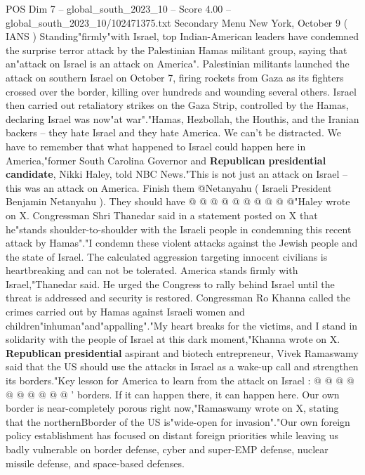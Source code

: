 \begin{textsample}{POS Dim 7 – global\_south\_2023\_10 – Score 4.00 – global\_south\_2023\_10/102471375.txt}  \label{ex:f7_pos_391}
Secondary Menu New York, October 9 ( IANS ) Standing"firmly"with Israel, top Indian-American leaders have condemned the surprise terror attack by the Palestinian Hamas militant group, saying that an"attack on Israel is an attack on America".
Palestinian militants launched the attack on southern Israel on October 7, firing rockets from Gaza as its fighters crossed over the border, killing over hundreds and wounding several others.
Israel then carried out retaliatory strikes on the Gaza Strip, controlled by the Hamas, declaring Israel was now"at war"."Hamas, Hezbollah, the Houthis, and the Iranian backers -- they hate Israel and they hate America.
We can't be distracted.
We have to remember that what happened to Israel could happen here in America,"former South Carolina Governor and \textbf{Republican} \textbf{presidential} \textbf{candidate}, Nikki Haley, told NBC News."This is not just an attack on Israel -- this was an attack on America.
Finish them @Netanyahu ( Israeli President Benjamin Netanyahu ).
They should have @ @ @ @ @ @ @ @ @ @"Haley wrote on X.
Congressman Shri Thanedar said in a statement posted on X that he"stands shoulder-to-shoulder with the Israeli people in condemning this recent attack by Hamas"."I condemn these violent attacks against the Jewish people and the state of Israel.
The calculated aggression targeting innocent civilians is heartbreaking and can not be tolerated.
America stands firmly with Israel,"Thanedar said.
He urged the Congress to rally behind Israel until the threat is addressed and security is restored.
Congressman Ro Khanna called the crimes carried out by Hamas against Israeli women and children"inhuman"and"appalling"."My heart breaks for the victims, and I stand in solidarity with the people of Israel at this dark moment,"Khanna wrote on X. \textbf{Republican} \textbf{presidential} aspirant and biotech entrepreneur, Vivek Ramaswamy said that the US should use the attacks in Israel as a wake-up call and strengthen its borders."Key lesson for America to learn from the attack on Israel : @ @ @ @ @ @ @ @ @ @ ' borders.
If it can happen there, it can happen here.
Our own border is near-completely porous right now,"Ramaswamy wrote on X, stating that the northernBborder of the US is"wide-open for invasion"."Our own foreign policy establishment has focused on distant foreign priorities while leaving us badly vulnerable on border defense, cyber and super-EMP defense, nuclear missile defense, and space-based defenses.

\end{textsample}
